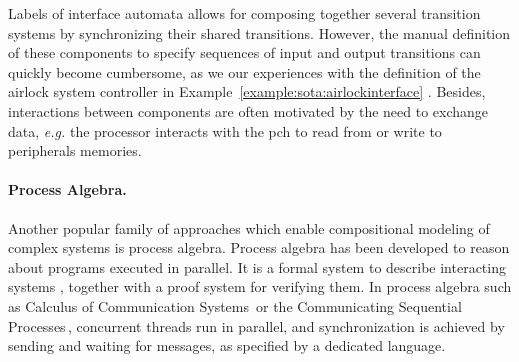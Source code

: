 Labels of interface automata allows for composing together several transition
systems by synchronizing their shared transitions.
%
However, the manual definition of these components to specify sequences of input
and output transitions can quickly become cumbersome, as we our experiences
 with the definition of the airlock system
controller in Example~\ref{example:sota:airlockinterface} .
%
Besides, interactions between components are often motivated by the need to
exchange data, \emph{e.g.} the processor interacts with the \ac{pch} to read
from or write to peripherals memories. 

\paragraph{Process Algebra.}
%
Another popular family of approaches which enable compositional modeling of
complex systems is process algebra.
%
Process algebra has been developed to reason about programs executed in
parallel.
%
It is a formal system to describe interacting systems , together with a proof system for verifying them.
%
In process algebra such as Calculus of Communication
Systems\,\cite{milner1980ccs} or the Communicating Sequential
Processes\,\cite{hoare1978csp}, concurrent threads run in parallel, and
synchronization is achieved by sending and waiting for messages, as specified by
a dedicated language.

